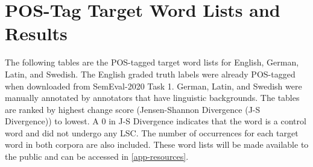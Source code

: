 \section{POS-Tag Target Word Lists and Results}
\label{app-postags}


The following tables are the POS-tagged target word lists for English, German, Latin, and Swedish. The English graded truth labels were already POS-tagged when downloaded from SemEval-2020 Task 1. German, Latin, and Swedish were manually annotated by annotators that have linguistic backgrounds. The tables are ranked by highest change score (Jensen-Shannon Divergence (J-S Divergence)) to lowest. A 0 in J-S Divergence indicates that the word is a control word and did not undergo any LSC. The number of occurrences for each target word in both corpora are also included. These word lists will be made available to the public and can be accessed in \autoref{app-resources}.



